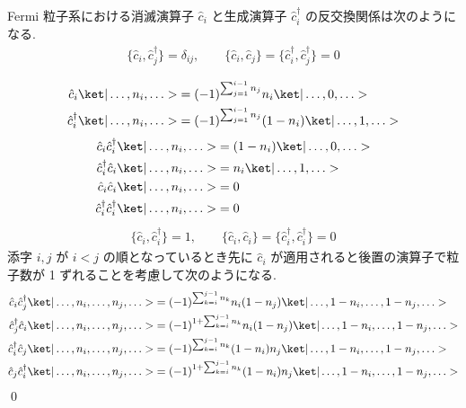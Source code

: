\documentclass[uplatex,dvipdfmx,a4paper,11pt]{jlreq}
\makeatletter
\numberwithin{equation}{section}
\theoremstyle{definition}
\renewenvironment{proof}[1][\proofname]{\par
  \normalfont
  \topsep6\p@\@plus6\p@ \trivlist
  \item[\hskip\labelsep{\bfseries #1}\@addpunct{\bfseries}]\ignorespaces\quad\par
}{%
  \qed\endtrivlist\@endpefalse
}
\renewcommand\proofname{証明}
\makeatother
\begin{document}
\begin{theorem}[Q21-52]
  Fermi 粒子系における消滅演算子 $\hat{c}_i$ と生成演算子 $\hat{c}_i^\dagger$ の反交換関係は次のようになる.
  \begin{align}
    \{\hat{c}_i, \hat{c}_j^\dagger\} = \delta_{ij}, \qquad \{\hat{c}_i, \hat{c}_j\} = \{\hat{c}_i^\dagger, \hat{c}_j^\dagger\} = 0
  \end{align}
\end{theorem}
\begin{proof}
  \begin{align}
    \hat{c}_i\ket|\ldots,n_i,\ldots>         & = (-1)^{\sum_{j=1}^{i-1}n_j}n_i\ket|\ldots,0,\ldots>       \\
    \hat{c}_i^\dagger\ket|\ldots,n_i,\ldots> & = (-1)^{\sum_{j=1}^{i-1}n_j}(1 - n_i)\ket|\ldots,1,\ldots>
  \end{align}
  \begin{align}
    \hat{c}_i\hat{c}_i^\dagger\ket|\ldots,n_i,\ldots>         & = (1 - n_i)\ket|\ldots,0,\ldots> \\
    \hat{c}_i^\dagger\hat{c}_i\ket|\ldots,n_i,\ldots>         & = n_i\ket|\ldots,1,\ldots>       \\
    \hat{c}_i\hat{c}_i\ket|\ldots,n_i,\ldots>                 & = 0                              \\
    \hat{c}_i^\dagger\hat{c}_i^\dagger\ket|\ldots,n_i,\ldots> & = 0
  \end{align}
  \begin{align}
    \{\hat{c}_i, \hat{c}_i^\dagger\} = 1, \qquad \{\hat{c}_i, \hat{c}_i\} = \{\hat{c}_i^\dagger, \hat{c}_i^\dagger\} = 0
  \end{align}
  添字 $i, j$ が $i < j$ の順となっているとき先に $\hat{c}_i$ が適用されると後置の演算子で粒子数が 1 ずれることを考慮して次のようになる.
  \begin{align}
    \hat{c}_i\hat{c}_j^\dagger\ket|\ldots,n_i,\ldots,n_j,\ldots>         & = (-1)^{\sum_{k=i}^{j-1}n_k}n_i(1 - n_j)\ket|\ldots,1-n_i,\ldots,1-n_j,\ldots>           \\
    \hat{c}_j^\dagger\hat{c}_i\ket|\ldots,n_i,\ldots,n_j,\ldots>         & = (-1)^{1 + \sum_{k=i}^{j-1}n_k}n_i(1 - n_j)\ket|\ldots,1-n_i,\ldots,1-n_j,\ldots>       \\
    \hat{c}_i^\dagger\hat{c}_j\ket|\ldots,n_i,\ldots,n_j,\ldots>         & = (-1)^{\sum_{k=i}^{j-1}n_k}(1 - n_i)n_j\ket|\ldots,1-n_i,\ldots,1-n_j,\ldots>           \\
    \hat{c}_j\hat{c}_i^\dagger\ket|\ldots,n_i,\ldots,n_j,\ldots>         & = (-1)^{1 + \sum_{k=i}^{j-1}n_k}(1 - n_i)n_j\ket|\ldots,1-n_i,\ldots,1-n_j,\ldots>       \\

\end{align}
\end{proof}
\end{document}
